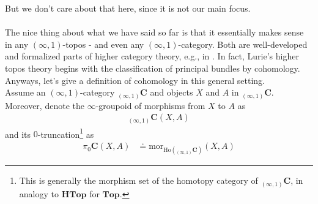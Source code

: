 But we don't care about that here, since it is not our main focus.
\\\\
The nice thing about what we have said so far is that it essentially makes sense in any $(\infty,1)$-topos - and even any $(\infty,1)$-category.
Both are well-developed and formalized parts of higher category theory, e.g., in \cite{0349e8ea}.
In fact, Lurie's higher topos theory \cite{0349e8ea} begins with the classification of principal bundles by cohomology.
Anyways, let's give a definition of cohomology in this general setting.
\\
Assume an $(\infty,1)$-category ${}_{(\infty,1)}\mathbf{C}$ and objects $X$ and $A$ in ${}_{(\infty,1)}\mathbf{C}$.
Moreover, denote the $\infty$-groupoid of morphisms from $X$ to $A$ as
\begin{align*}
  {}_{(\infty,1)}\mathbf{C}
  \left(
    X,
    A
  \right)
\end{align*}
and its $0$-truncation\footnote{This is generally the morphism set of the homotopy category of ${}_{(\infty,1)}\mathbf{C}$, in analogy to $\mathbf{HTop}$ for $\mathbf{Top}$.} as
\begin{align*}
  \pi_{0}
  \mathbf{C}
  \left(
    X,
    A
  \right)
  &\doteq
  \mathrm{mor}_{\mathrm{Ho}({}_{(\infty,1)}\mathbf{C})}
  \left(
    X,
    A
  \right)
\end{align*}

